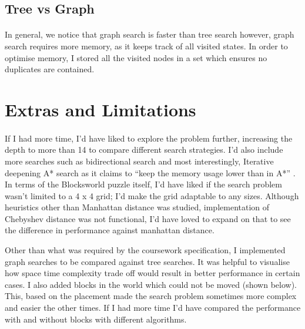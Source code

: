 \documentclass[10pt]{article}
\begin{document}
  \subsection{Tree vs Graph}
  \paragraph{} \indent
  In general, we notice that graph search is faster than tree search however, graph search requires more memory, as it keeps track of all visited states. In order to optimise memory, I stored all the visited nodes in a set which ensures no duplicates are contained. 

  \section{Extras and Limitations}
  \paragraph{} \indent
  If I had more time, I’d have liked to explore the problem further, increasing the depth to more than 14 to compare different search strategies. I’d also include more searches such as bidirectional search and most interestingly, Iterative deepening A* search as it claims to ``keep the memory usage lower than in A*'' \cite{ida*}. In terms of the Blocksworld puzzle itself, I'd have liked if the search problem wasn't limited to a 4 x 4 grid; I'd make the grid adaptable to any sizes. Although heuristics other than Manhattan distance was studied, implementation of Chebyshev distance \cite{chev} was not functional, I'd have loved to expand on that to see the difference in performance against manhattan distance. 

  Other than what was required by the coursework specification, I implemented graph searches to be compared against tree searches. It was helpful to visualise how space time complexity trade off would result in better performance in certain cases. I also added blocks in the world which could not be moved (shown below). This, based on the placement made the search problem sometimes more complex and easier the other times. If I had more time I'd have compared the performance with and without blocks with different algorithms.
  
\end{document}

